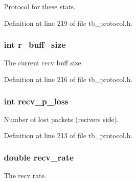 Protocol for these stats. 



Definition at line 219 of file tb\-\_\-protocol.\-h.

\hypertarget{structtb__prot__stats__t_a0875385576dea06176e123aca81e2b53}{
\subsubsection[{r\-\_\-buff\-\_\-size}]{\setlength{\rightskip}{0pt plus 5cm}int r\-\_\-buff\-\_\-size}}\label{structtb__prot__stats__t_a0875385576dea06176e123aca81e2b53}


The current recv buff size. 



Definition at line 216 of file tb\-\_\-protocol.\-h.

\hypertarget{structtb__prot__stats__t_ad24965ef016625acedfa758f91151fb6}{
\subsubsection[{recv\-\_\-p\-\_\-loss}]{\setlength{\rightskip}{0pt plus 5cm}int recv\-\_\-p\-\_\-loss}}\label{structtb__prot__stats__t_ad24965ef016625acedfa758f91151fb6}


Number of lost packets (recivers side). 



Definition at line 213 of file tb\-\_\-protocol.\-h.

\hypertarget{structtb__prot__stats__t_aa453b7c484e3457e06bdf4e791bde373}{
\subsubsection[{recv\-\_\-rate}]{\setlength{\rightskip}{0pt plus 5cm}double recv\-\_\-rate}}\label{structtb__prot__stats__t_aa453b7c484e3457e06bdf4e791bde373}


The recv rate. 



